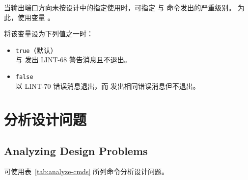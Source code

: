 当输出端口方向未按设计中的指定使用时，可指定  与  命令发出的严重级别。
为此，使用变量 。

将该变量设为下列值之一时：
\begin{itemize}
  \item \texttt{true}（默认）\\
         与  发出 LINT-68 警告消息且不退出。
  \item \texttt{false}\\
         以 LINT-70 错误消息退出，而  发出相同错误消息但不退出。
\end{itemize}

\section{分析设计问题}
\subsection*{Analyzing Design Problems}

可使用表~\ref{tab:analyze-cmds} 所列命令分析设计问题。

